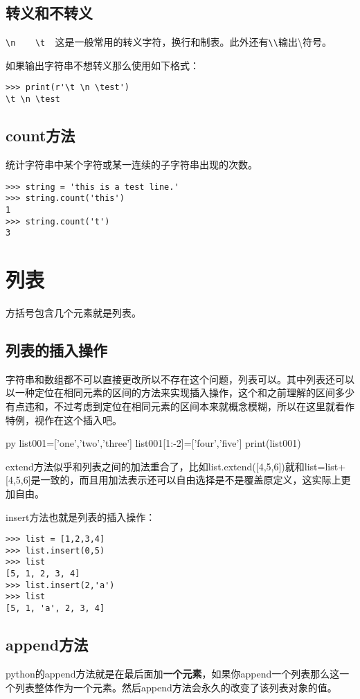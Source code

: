 \documentclass[12pt,oneside]{book}
\begin{document}
\begin{common-format}
\subsection{转义和不转义}
\verb+\n    \t  +这是一般常用的转义字符，换行和制表。此外还有\verb+\\+输出\textbackslash 符号。

如果输出字符串不想转义那么使用如下格式：
\begin{Verbatim}
>>> print(r'\t \n \test')
\t \n \test
\end{Verbatim}

\subsection{count方法}
统计字符串中某个字符或某一连续的子字符串出现的次数。
\begin{Verbatim}
>>> string = 'this is a test line.'
>>> string.count('this')
1
>>> string.count('t')
3
\end{Verbatim}


\section{列表}
方括号包含几个元素就是列表。


\subsection{列表的插入操作}
\label{sec:列表插入操作}
字符串和数组都不可以直接更改所以不存在这个问题，列表可以。其中列表还可以以一种定位在相同元素的区间的方法来实现插入操作，这个和之前理解的区间多少有点违和，不过考虑到定位在相同元素的区间本来就概念模糊，所以在这里就看作特例，视作在这个插入吧。
\begin{xverbatim}[129]{py}
list001=['one','two','three']
list001[1:-2]=['four','five']
print(list001)
\end{xverbatim}

extend方法似乎和列表之间的加法重合了，比如list.extend([4,5,6])就和list=list+[4,5,6]是一致的，而且用加法表示还可以自由选择是不是覆盖原定义，这实际上更加自由。

insert方法也就是列表的插入操作：
\begin{Verbatim}
>>> list = [1,2,3,4]
>>> list.insert(0,5)
>>> list
[5, 1, 2, 3, 4]
>>> list.insert(2,'a')
>>> list
[5, 1, 'a', 2, 3, 4]
\end{Verbatim}


\subsection{append方法}
python的append方法就是在最后面加\textbf{一个元素}，如果你append一个列表那么这一个列表整体作为一个元素。然后append方法会永久的改变了该列表对象的值。


\end{common-format}
\end{document}
